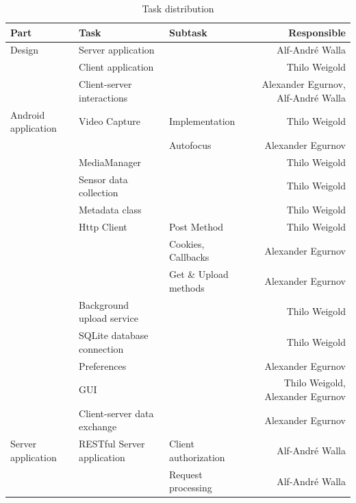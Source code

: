 \documentclass[conference]{IEEEtran}
\begin{document}



%


\begin{table}[t]
	\centering
	\renewcommand{\arraystretch}{1.5}
	\caption{Task distribution}
	\label{tab:task_distr}
	\begin{tabular}{lllr}
		\toprule
		Part & Task & Subtask & Responsible \\
		\midrule
		Design
			& Server application & & Alf-André Walla \\
			& Client application & & Thilo Weigold \\
			& Client-server interactions & & Alexander Egurnov, Alf-André Walla \\
		\midrule
		Android application
			& Video Capture & Implementation & Thilo Weigold \\
			&       & Autofocus & Alexander Egurnov \\
			& MediaManager & & Thilo Weigold \\
			& Sensor data collection & & Thilo Weigold \\
			& Metadata class & & Thilo Weigold \\
			& Http Client & Post Method & Thilo Weigold \\
			&       & Cookies, Callbacks & Alexander Egurnov \\
			&       & Get \& Upload methods & Alexander Egurnov \\
			& Background upload service & & Thilo Weigold \\
			& SQLite database connection & & Thilo Weigold \\
			& Preferences & & Alexander Egurnov \\
			& GUI & & Thilo Weigold, Alexander Egurnov \\
			& Client-server data exchange & & Alexander Egurnov \\
		\midrule
		Server application 
			& RESTful Server application & Client authorization & Alf-André Walla \\
			&       & Request processing & Alf-André Walla \\

\end{tabular}
\end{table}
\end{document}

